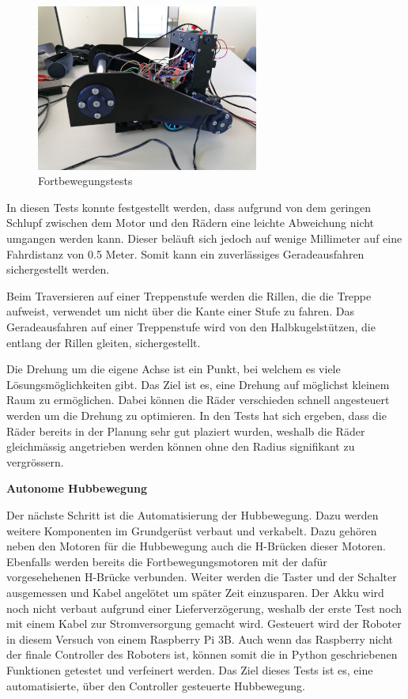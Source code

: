 \begin{figure}[H]
  \includegraphics[width=0.65\textwidth]{img/Sprint3/fortbewegung.jpg}
  \centering
  \caption{Fortbewegungstests}
  \label{fig:Fortbewegungstests}
\end{figure}
In diesen Tests konnte festgestellt werden, dass aufgrund von dem geringen Schlupf zwischen dem Motor und den Rädern eine leichte Abweichung nicht umgangen werden kann. Dieser beläuft sich jedoch auf wenige Millimeter auf eine Fahrdistanz von 0.5 Meter. Somit kann ein zuverlässiges Geradeausfahren sichergestellt werden.

Beim Traversieren auf einer Treppenstufe werden die Rillen, die die Treppe aufweist, verwendet um nicht über die Kante einer Stufe zu fahren. Das Geradeausfahren auf einer Treppenstufe wird von den Halbkugelstützen, die entlang der Rillen gleiten, sichergestellt.

Die Drehung um die eigene Achse ist ein Punkt, bei welchem es viele Lösungsmöglichkeiten gibt. Das Ziel ist es, eine Drehung auf möglichst kleinem Raum zu ermöglichen. Dabei können die Räder verschieden schnell angesteuert werden um die Drehung zu optimieren. In den Tests hat sich ergeben, dass die Räder bereits in der Planung sehr gut plaziert wurden, weshalb die Räder gleichmässig angetrieben werden können ohne den Radius signifikant zu vergrössern.

\newpage

\textbf{Autonome Hubbewegung}

Der nächste Schritt ist die Automatisierung der Hubbewegung. Dazu werden weitere Komponenten im Grundgerüst verbaut und verkabelt. Dazu gehören neben den Motoren für die Hubbewegung auch die H-Brücken dieser Motoren. Ebenfalls werden bereits die Fortbewegungsmotoren mit der dafür vorgesehehenen H-Brücke verbunden. Weiter werden die Taster und der Schalter ausgemessen und Kabel angelötet um später Zeit einzusparen. Der Akku wird noch nicht verbaut aufgrund einer Lieferverzögerung, weshalb der erste Test noch mit einem Kabel zur Stromversorgung gemacht wird. Gesteuert wird der Roboter in diesem Versuch von einem Raspberry Pi 3B.
Auch wenn das Raspberry nicht der finale Controller des Roboters ist, können somit die in Python geschriebenen Funktionen getestet und verfeinert werden.
Das Ziel dieses Tests ist es, eine automatisierte, über den Controller gesteuerte Hubbewegung.


